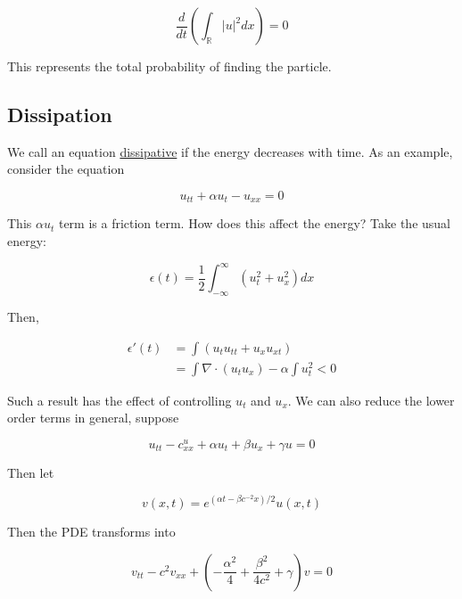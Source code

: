 \documentclass{article}
\newtheorem{one minute paper}[theorem]{One Minute Paper}
\begin{document}
\begin{equation}
    \frac{d}{dt}\left( \int_{\mathbb{R}}|u|^2 dx \right) = 0
\end{equation}

This represents the total probability of finding the particle.

\subsection*{Dissipation}

We call an equation \underline{dissipative} if the energy decreases with time. As an example, consider the equation

\begin{equation}
    u_{tt} + \alpha u_t - u_{xx} = 0
\end{equation}

This $\alpha u_t$ term is a friction term. How does this affect the energy? Take the usual energy:

\begin{equation}
    \epsilon(t) = \frac{1}{2}\int_{-\infty}^{\infty}\left( u_t^2 + u_x^2 \right)dx
\end{equation}

Then, 

\begin{align*}
    \epsilon'(t) &= \int \left( u_t u_{tt} + u_x u_{xt} \right) \\
    &= \int \nabla \cdot (u_t u_x) - \alpha \int u_t^2 < 0
\end{align*}

Such a result has the effect of controlling $u_t$ and $u_x$. We can also reduce the lower order terms in general, suppose 

\begin{equation}
    u_{tt} - c^u_{xx} + \alpha u_t + \beta u_x + \gamma u =0
\end{equation}

Then let 

\begin{equation}
    v(x,t) = e^{(\alpha t - \beta c^{-2}x)/2}u(x,t)
\end{equation}

Then the PDE transforms into 

\begin{equation}
    v_{tt} - c^2 v_{xx} + \left( -\frac{\alpha^2}{4} + \frac{\beta^2}{4c^2} + \gamma \right) v = 0
\end{equation}
\end{document}
